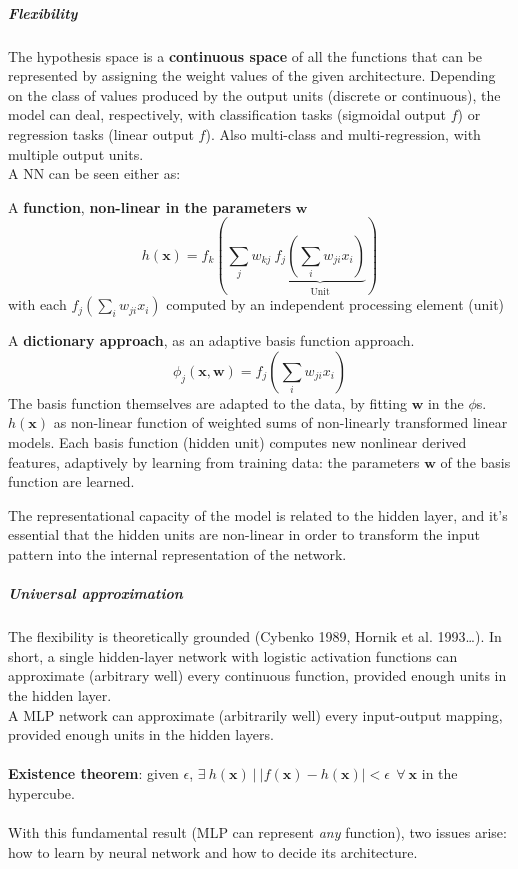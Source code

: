 \documentclass[10pt]{report}
\begin{document}
\subparagraph{Flexibility} The hypothesis space is a \textbf{continuous space} of all the functions that can be represented by assigning the weight values of the given architecture. Depending on the class of values produced by the output units (discrete or continuous), the model can deal, respectively, with classification tasks (sigmoidal output $f$) or regression tasks (linear output $f$). Also multi-class and multi-regression, with multiple output units.\\
A NN can be seen either as:
\begin{list}{}{}
	\item A \textbf{function}, \textbf{non-linear in the parameters} $\mathbf{w}$ $$h(\mathbf{x}) = f_k\left(\sum_j w_{kj}\:\underset{\text{Unit}}{\underbrace{f_j\left(\sum_i w_{ji}x_i\right)}}\right)$$
	with each $f_j\left(\sum_i w_{ji}x_i\right)$ computed by an independent processing element (unit)
	\item A \textbf{dictionary approach}, as an adaptive basis function approach. $$\phi_j(\mathbf{x},\mathbf{w})=f_j\left(\sum_i w_{ji}x_i\right)$$
	The basis function themselves are adapted to the data, by fitting $\mathbf{w}$ in the $\phi$s.\\
	$h(\mathbf{x})$ as non-linear function of weighted sums of non-linearly transformed linear models. Each basis function (hidden unit) computes new nonlinear derived features, adaptively by learning from training data: the parameters $\mathbf{w}$ of the basis function are learned.
\end{list}
The representational capacity of the model is related to the hidden layer, and it's essential that the hidden units are non-linear in order to transform the input pattern into the internal representation of the network.
\subparagraph{Universal approximation} The flexibility is theoretically grounded (Cybenko 1989, Hornik et al. 1993\ldots). In short, a single hidden-layer network with logistic activation functions can approximate (arbitrary well) every continuous function, provided enough units in the hidden layer.\\
A MLP network can approximate (arbitrarily well) every input-output mapping, provided enough units in the hidden layers.\\\\
\textbf{Existence theorem}: given $\epsilon$, $\exists\:h(\mathbf{x})\:|\:|f(\mathbf{x}) - h(\mathbf{x})|< \epsilon\:\:\forall\:\mathbf{x}$ in the hypercube.\\\\
With this fundamental result (MLP can represent \textit{any} function), two issues arise: how to learn by neural network and how to decide its architecture.
\end{document}
